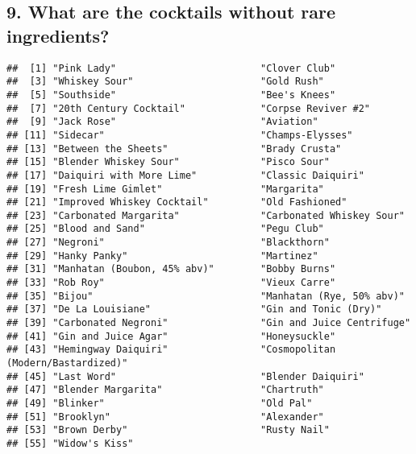 \documentclass[
]{article}
\newenvironment{Shaded}{\begin{snugshade}}{\end{snugshade}}
\newcommand{\DecValTok}[1]{\textcolor[rgb]{0.00,0.00,0.81}{#1}}
\newcommand{\KeywordTok}[1]{\textcolor[rgb]{0.13,0.29,0.53}{\textbf{#1}}}
\newcommand{\NormalTok}[1]{#1}
\newcommand{\OperatorTok}[1]{\textcolor[rgb]{0.81,0.36,0.00}{\textbf{#1}}}
\newcommand{\StringTok}[1]{\textcolor[rgb]{0.31,0.60,0.02}{#1}}
\begin{document}
\hypertarget{what-are-the-cocktails-without-rare-ingredients}{%
\subsection{9. What are the cocktails without rare
ingredients?}\label{what-are-the-cocktails-without-rare-ingredients}}

\begin{Shaded}
\end{Shaded}

\begin{verbatim}
##  [1] "Pink Lady"                         "Clover Club"                      
##  [3] "Whiskey Sour"                      "Gold Rush"                        
##  [5] "Southside"                         "Bee's Knees"                      
##  [7] "20th Century Cocktail"             "Corpse Reviver #2"                
##  [9] "Jack Rose"                         "Aviation"                         
## [11] "Sidecar"                           "Champs-Elysses"                   
## [13] "Between the Sheets"                "Brady Crusta"                     
## [15] "Blender Whiskey Sour"              "Pisco Sour"                       
## [17] "Daiquiri with More Lime"           "Classic Daiquiri"                 
## [19] "Fresh Lime Gimlet"                 "Margarita"                        
## [21] "Improved Whiskey Cocktail"         "Old Fashioned"                    
## [23] "Carbonated Margarita"              "Carbonated Whiskey Sour"          
## [25] "Blood and Sand"                    "Pegu Club"                        
## [27] "Negroni"                           "Blackthorn"                       
## [29] "Hanky Panky"                       "Martinez"                         
## [31] "Manhatan (Boubon, 45% abv)"        "Bobby Burns"                      
## [33] "Rob Roy"                           "Vieux Carre"                      
## [35] "Bijou"                             "Manhatan (Rye, 50% abv)"          
## [37] "De La Louisiane"                   "Gin and Tonic (Dry)"              
## [39] "Carbonated Negroni"                "Gin and Juice Centrifuge"         
## [41] "Gin and Juice Agar"                "Honeysuckle"                      
## [43] "Hemingway Daiquiri"                "Cosmopolitan (Modern/Bastardized)"
## [45] "Last Word"                         "Blender Daiquiri"                 
## [47] "Blender Margarita"                 "Chartruth"                        
## [49] "Blinker"                           "Old Pal"                          
## [51] "Brooklyn"                          "Alexander"                        
## [53] "Brown Derby"                       "Rusty Nail"                       
## [55] "Widow's Kiss"
\end{verbatim}
\end{document}
